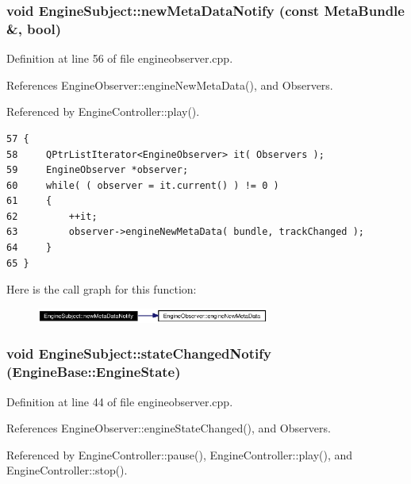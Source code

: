 \subsubsection{\setlength{\rightskip}{0pt plus 5cm}void Engine\-Subject::new\-Meta\-Data\-Notify (const {\bf Meta\-Bundle} \&, bool)\hspace{0.3cm}{\tt  [protected]}}\label{classEngineSubject_EngineSubjectb3}




Definition at line 56 of file engineobserver.cpp.

References Engine\-Observer::engine\-New\-Meta\-Data(), and Observers.

Referenced by Engine\-Controller::play().



\footnotesize\begin{verbatim}57 {
58     QPtrListIterator<EngineObserver> it( Observers );
59     EngineObserver *observer;
60     while( ( observer = it.current() ) != 0 )
61     {
62         ++it;
63         observer->engineNewMetaData( bundle, trackChanged );
64     }
65 }
\end{verbatim}\normalsize 


Here is the call graph for this function:\begin{figure}[H]
\begin{center}
\leavevmode
\includegraphics[width=217pt]{classEngineSubject_EngineSubjectb3_cgraph}
\end{center}
\end{figure}
\subsubsection{\setlength{\rightskip}{0pt plus 5cm}void Engine\-Subject::state\-Changed\-Notify ({\bf Engine\-Base::Engine\-State})\hspace{0.3cm}{\tt  [protected]}}\label{classEngineSubject_EngineSubjectb2}




Definition at line 44 of file engineobserver.cpp.

References Engine\-Observer::engine\-State\-Changed(), and Observers.

Referenced by Engine\-Controller::pause(), Engine\-Controller::play(), and Engine\-Controller::stop().




